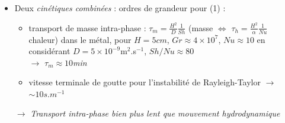 \begin{frame}
\begin{itemize}
\begin{itemize}
      \end{itemize}
      \item Deux \emph{cinétiques combinées} : ordres de grandeur pour \textcolor{OliveGreen}{(1)} :
      \begin{itemize}
\item transport de masse intra-phase : $\tau_m = \frac{H^2}{D} \frac{1}{Sh}$ (masse $\Leftrightarrow$ $\tau_h = \frac{H^2}{\alpha} \frac{1}{Nu}$ chaleur)
dans le métal, pour $H=5cm$, $Gr\approx4\times 10^{7}$, $Nu\approx10$
en considérant $D=5\times 10^{-9}$m$^2$.s$^{-1}$, $Sh/Nu\approx80$ \\$\rightarrow$ \emph{$\tau_m \approx 10$min}
\item vitesse terminale de goutte pour l'instabilité de Rayleigh-Taylor $\rightarrow$ \emph{$\sim 10s.m^{-1}$}
      \end{itemize}
      \hskip -0.5cm $\rightarrow$ \emph{Transport intra-phase bien plus lent que mouvement hydrodynamique}
\end{itemize}
    \end{frame}
